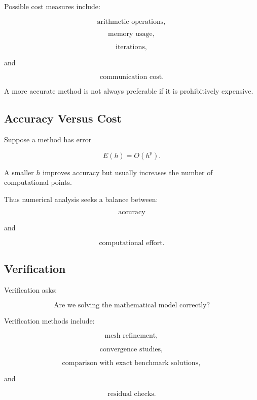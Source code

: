 Possible cost measures include:

\[
\boxed{
\text{arithmetic operations},
}
\]

\[
\boxed{
\text{memory usage},
}
\]

\[
\boxed{
\text{iterations},
}
\]

and

\[
\boxed{
\text{communication cost}.
}
\]

A more accurate method is not always preferable if it is prohibitively
expensive.

\subsection{Accuracy Versus Cost}
\label{subsec:accuracy-versus-cost}

Suppose a method has error

\[
E(h)
=
O(h^p).
\]

A smaller \(h\) improves accuracy but usually increases the number of
computational points.

Thus numerical analysis seeks a balance between:

\[
\boxed{
\text{accuracy}
}
\]

and

\[
\boxed{
\text{computational effort}.
}
\]

\subsection{Verification}
\label{subsec:numerical-verification}

Verification asks:

\[
\boxed{
\text{Are we solving the mathematical model correctly?}
}
\]

Verification methods include:

\[
\boxed{
\text{mesh refinement},
}
\]

\[
\boxed{
\text{convergence studies},
}
\]

\[
\boxed{
\text{comparison with exact benchmark solutions},
}
\]

and

\[
\boxed{
\text{residual checks}.
}
\]


